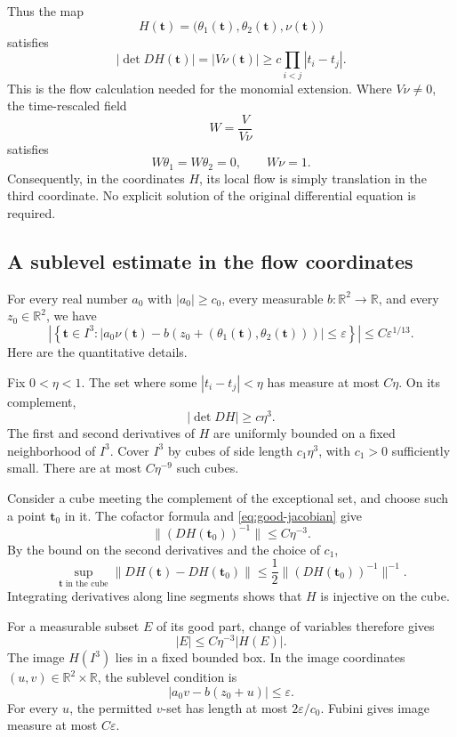 \documentclass[11pt,a4paper]{article}
\newcommand{\R}{\mathbb R}
\begin{document}
Thus the map
\[
H(\mathbf t)=\bigl(\theta_1(\mathbf t),\theta_2(\mathbf t),\nu(\mathbf t)\bigr)
\tag{3.7}\label{eq:flow-map}
\]
satisfies
\[
|\det DH(\mathbf t)|=|V\nu(\mathbf t)|
\geq c\prod_{i<j}|t_i-t_j|.
\tag{3.8}\label{eq:jacobian-bound}
\]
This is the flow calculation needed for the monomial extension. Where
$V\nu\neq0$, the time-rescaled field
\[
W=\frac{V}{V\nu}
\]
satisfies
\[
W\theta_1=W\theta_2=0,\qquad W\nu=1.
\]
Consequently, in the coordinates $H$, its local flow is simply translation
in the third coordinate. No explicit solution of the original
differential equation is required.

\subsection{A sublevel estimate in the flow coordinates}

For every real number $a_0$ with $|a_0|\geq c_0$, every measurable
$b:\R^2\to\R$, and every $z_0\in\R^2$, we have
\[
\left|\left\{\mathbf t\in I^3:
|a_0\nu(\mathbf t)-b(z_0+(\theta_1(\mathbf t),\theta_2(\mathbf t)))|
\leq\varepsilon\right\}\right|
\leq C\varepsilon^{1/13}.
\tag{3.9}\label{eq:coordinate-sublevel}
\]
Here are the quantitative details.

Fix $0<\eta<1$. The set where some $|t_i-t_j|<\eta$ has measure at most
$C\eta$. On its complement,
\[
|\det DH|\geq c\eta^3.
\tag{3.10}\label{eq:good-jacobian}
\]
The first and second derivatives of $H$ are uniformly bounded on a fixed
neighborhood of $I^3$. Cover $I^3$ by cubes of side length $c_1\eta^3$,
with $c_1>0$ sufficiently small. There are at most $C\eta^{-9}$ such cubes.

Consider a cube meeting the complement of the exceptional set, and choose
such a point $\mathbf t_0$ in it. The cofactor formula and
\eqref{eq:good-jacobian} give
\[
\|(DH(\mathbf t_0))^{-1}\|\leq C\eta^{-3}.
\]
By the bound on the second derivatives and the choice of $c_1$,
\[
\sup_{\mathbf t\text{ in the cube}}
\|DH(\mathbf t)-DH(\mathbf t_0)\|
\leq\frac12\|(DH(\mathbf t_0))^{-1}\|^{-1}.
\]
Integrating derivatives along line segments shows that $H$ is injective
on the cube.

For a measurable subset $E$ of its good part, change of variables
therefore gives
\[
|E|\leq C\eta^{-3}|H(E)|.
\]
The image $H(I^3)$ lies in a fixed bounded box. In the image coordinates
$(u,v)\in\R^2\times\R$, the sublevel condition is
\[
|a_0v-b(z_0+u)|\leq\varepsilon.
\]
For every $u$, the permitted $v$-set has length at most
$2\varepsilon/c_0$. Fubini gives image measure at most $C\varepsilon$.
\end{document}

